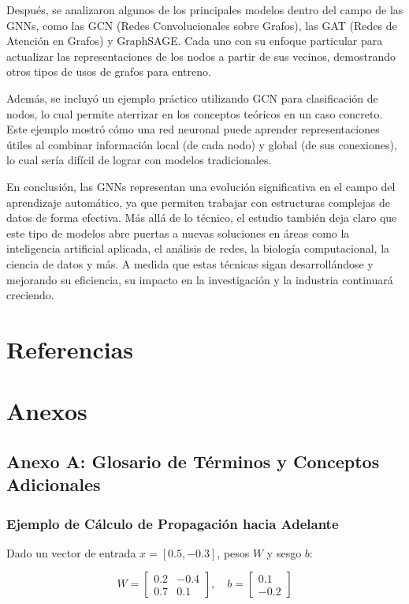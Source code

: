 \documentclass[11pt]{article} %
\begin{document}
Después, se analizaron algunos de los principales modelos dentro del campo de las GNNs, como las GCN (Redes Convolucionales sobre Grafos), las GAT (Redes de Atención en Grafos) y GraphSAGE. Cada uno con su enfoque particular para actualizar las representaciones de los nodos a partir de sus vecinos, demostrando otros tipos de usos de grafos para entreno.

Además, se incluyó un ejemplo práctico utilizando GCN para clasificación de nodos, lo cual permite aterrizar en los conceptos teóricos en un caso concreto. Este ejemplo mostró cómo una red neuronal puede aprender representaciones útiles al combinar información local (de cada nodo) y global (de sus conexiones), lo cual sería difícil de lograr con modelos tradicionales.

En conclusión, las GNNs representan una evolución significativa en el campo del aprendizaje automático, ya que permiten trabajar con estructuras complejas de datos de forma efectiva. Más allá de lo técnico, el estudio también deja claro que este tipo de modelos abre puertas a nuevas soluciones en áreas como la inteligencia artificial aplicada, el análisis de redes, la biología computacional, la ciencia de datos y más. A medida que estas técnicas sigan desarrollándose y mejorando su eficiencia, su impacto en la investigación y la industria continuará creciendo.




\newpage
\section{Referencias}
\nocite{*}
\printbibliography
\newpage 
\section{Anexos}
\vspace{10pt}
\subsection{Anexo A: Glosario de Términos y Conceptos Adicionales}
\subsubsection{Ejemplo de Cálculo de Propagación hacia Adelante}
Dado un vector de entrada \(x = [0.5, -0.3]\), pesos \(W\) y sesgo \(b\):

\[
W = \begin{bmatrix}
0.2 & -0.4 \\
0.7 & 0.1 
\end{bmatrix}, \quad
b = \begin{bmatrix}
0.1 \\
-0.2
\end{bmatrix}
\]
\end{document}
